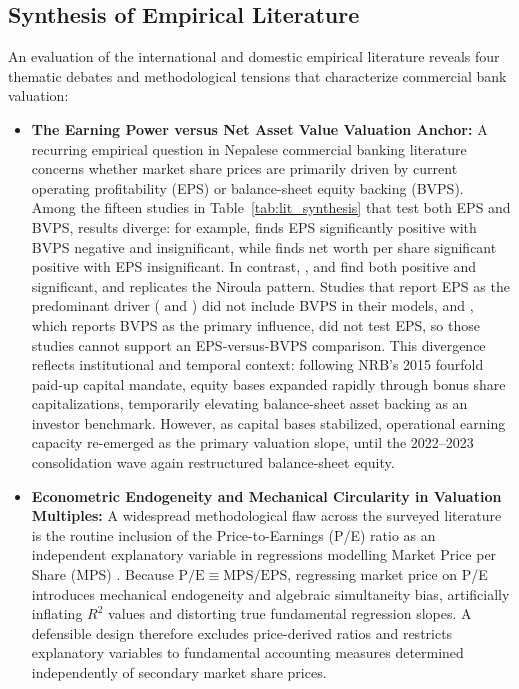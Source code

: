 \subsection{Synthesis of Empirical Literature}
\label{subsec:synthesis_matrix}

An evaluation of the international and domestic empirical literature reveals four thematic debates and methodological tensions that characterize commercial bank valuation:

\begin{itemize}
\item \textbf{The Earning Power versus Net Asset Value Valuation Anchor:}
A recurring empirical question in Nepalese commercial banking literature concerns whether market share prices are primarily driven by current operating profitability (EPS) or balance-sheet equity backing (BVPS). Among the fifteen studies in Table~\ref{tab:lit_synthesis} that test both EPS and BVPS, results diverge: for example, \citet{niroula2021} finds EPS significantly positive with BVPS negative and insignificant, while \citet{giri2024} finds net worth per share significant positive with EPS insignificant. In contrast, \citet{joshi2023}, \citet{gurung2024} and \citet{chhetri2023} find both positive and significant, and \citet{pant2024} replicates the Niroula pattern. Studies that report EPS as the predominant driver (\citet{bhandari2026} and \citet{chaudhari2025}) did not include BVPS in their models, and \citet{silwal2019}, which reports BVPS as the primary influence, did not test EPS, so those studies cannot support an EPS-versus-BVPS comparison. This divergence reflects institutional and temporal context: following NRB's 2015 fourfold paid-up capital mandate, equity bases expanded rapidly through bonus share capitalizations, temporarily elevating balance-sheet asset backing as an investor benchmark. However, as capital bases stabilized, operational earning capacity re-emerged as the primary valuation slope, until the 2022--2023 consolidation wave again restructured balance-sheet equity.

\item \textbf{Econometric Endogeneity and Mechanical Circularity in Valuation Multiples:}
A widespread methodological flaw across the surveyed literature is the routine inclusion of the Price-to-Earnings (P/E) ratio as an independent explanatory variable in regressions modelling Market Price per Share (MPS) \citep{almumani2014,bajracharya2019,bhandari2026,bhattarai2014,chhetri2023,dahal2025,giri2024,gurung2024,gurungdahal2025,gyawali2022,joshi2023,lamsal2024,malhotra2013,niroula2021,pant2024,pradhan2016,sharma2011,silwal2019,timalsina2026}. Because $\text{P/E} \equiv \text{MPS} / \text{EPS}$, regressing market price on P/E introduces mechanical endogeneity and algebraic simultaneity bias, artificially inflating $R^2$ values and distorting true fundamental regression slopes. A defensible design therefore excludes price-derived ratios and restricts explanatory variables to fundamental accounting measures determined independently of secondary market share prices.


\end{itemize}
